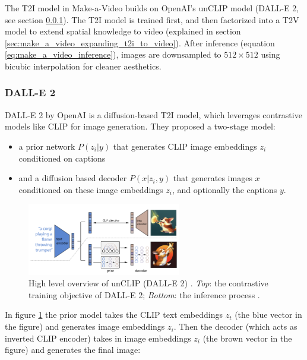 The T2I model in Make-a-Video builds on OpenAI's unCLIP model (DALL-E 2, see section \ref{sec:dalle_2}). The T2I model is trained first, and then factorized into a T2V model to extend spatial knowledge to video (explained in section \ref{sec:make_a_video_expanding_t2i_to_video}). After inference (equation \ref{eq:make_a_video_inference}), images are downsampled to $512\times 512$ using bicubic interpolation for cleaner aesthetics.







\subsubsection{DALL-E 2}
\label{sec:dalle_2}

DALL-E 2 by OpenAI \cite{dalle_2} is a diffusion-based T2I model, which leverages contrastive models like CLIP for image generation. They proposed a two-stage model: 

\begin{itemize}
    \item a prior network $P(z_i | y)$ that generates CLIP image embeddings $z_i$ conditioned on captions
    \item and a diffusion based decoder $P(x | z_i, y)$ that generates images $x$ conditioned on these image embeddings $z_i$, and optionally the captions $y$.
\end{itemize}

\begin{figure}
    \centering
    \includegraphics[width=0.6\textwidth]{images/make_a_video/dalle_2.png}
    \caption{High level overview of unCLIP (DALL-E 2) \cite{dalle_2}. \textit{Top}: the contrastive training objective of DALL-E 2; \textit{Bottom}: the inference process \cite{dalle_2}.}
    \label{fig:make_a_video_dalle2_overview}
\end{figure}

In figure \ref{fig:make_a_video_dalle2_overview} the prior model takes the CLIP text embeddings $z_t$ (the blue vector in the figure) and generates image embeddings $z_i$. Then the decoder (which acts as inverted CLIP encoder) takes in image embeddings $z_i$ (the brown vector in the figure) and generates the final image:

